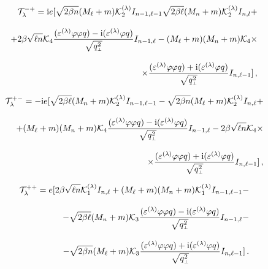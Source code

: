 \documentclass[14pt, russian]{article}
\def\mprp{\mbox{\tiny $\bot$}}
\newcommand{\ii}{\mathrm{i}} %
\begin{document}
\begin{eqnarray}
	\label{eq:tV-+} 
	\nonumber
	&&{\cal T}^{-+}_\lambda = \ii e [\sqrt{2\beta n} (M_\ell + m) {\cal K}_2^{(\lambda)} 
	I_{n-1,\ell-1} \sqrt{2\beta \ell} (M_n + m) {\cal K}_2^{(\lambda)} I_{n,l} +
	\\[3mm]
	&&+ 2\beta\sqrt{\ell n} {\cal K}_4 
	\frac{(\varepsilon^{(\lambda)}\varphi\varphi q) - \ii (\varepsilon^{(\lambda)}\varphi q)}{\sqrt{q^2_{\mprp}}} I_{n-1,\ell} -
	(M_\ell + m)(M_n + m) {\cal K}_4 
	\times
	\\[3mm]
	\nonumber
	&&\times
	\frac{(\varepsilon^{(\lambda)}\varphi\varphi q) + 
	\ii (\varepsilon^{(\lambda)}\varphi q)}{\sqrt{q^2_{\mprp}}} I_{n,\ell-1}]  \, ,
\end{eqnarray}

\begin{eqnarray}
	\label{eq:tV+-} 
	\nonumber
	&&{\cal T}^{+-}_\lambda = -\ii e [\sqrt{2\beta \ell} (M_n + m) {\cal K}_2^{(\lambda)} 
	I_{n-1,\ell-1} - \sqrt{2\beta n} (M_\ell + m) {\cal K}_2^{(\lambda)} I_{n,\ell} +
	\\[3mm]
	&&+ (M_\ell + m)(M_n + m) {\cal K}_4 
	\frac{(\varepsilon^{(\lambda)}\varphi\varphi q) - \ii (\varepsilon^{(\lambda)}\varphi q)}{\sqrt{q^2_{\mprp}}} I_{n-1,\ell} -
	2\beta\sqrt{\ell n} {\cal K}_4 
	\times
	\\[3mm]
	\nonumber
	&&\times
	\frac{(\varepsilon^{(\lambda)}\varphi\varphi q) + \ii (\varepsilon^{(\lambda)}\varphi q)}{\sqrt{q^2_{\mprp}}} I_{n,\ell-1}]  \, ,
	\nonumber
\end{eqnarray}

\begin{eqnarray}
	\label{eq:tV++} 
	\nonumber
	&&{\cal T}^{++}_\lambda  = e [2\beta\sqrt{\ell n} {\cal K}_1^{(\lambda)} I_{n,\ell} +
	(M_\ell + m)(M_n + m) {\cal K}_1^{(\lambda)} I_{n-1,\ell-1} -
	\\[3mm]
	&&- \sqrt{2\beta \ell} (M_n + m) {\cal K}_3
	\frac{(\varepsilon^{(\lambda)}\varphi\varphi q) - \ii (\varepsilon^{(\lambda)}\varphi q)}{\sqrt{q^2_{\mprp}}} I_{n-1,\ell} -
	\\[3mm]
	\nonumber
	&&- \sqrt{2\beta n} (M_\ell + m) {\cal K}_3 
	\frac{(\varepsilon^{(\lambda)}\varphi\varphi q) + \ii (\varepsilon^{(\lambda)}\varphi q)}{\sqrt{q^2_{\mprp}}} I_{n,\ell-1}] \, .
\end{eqnarray}
\end{document}
